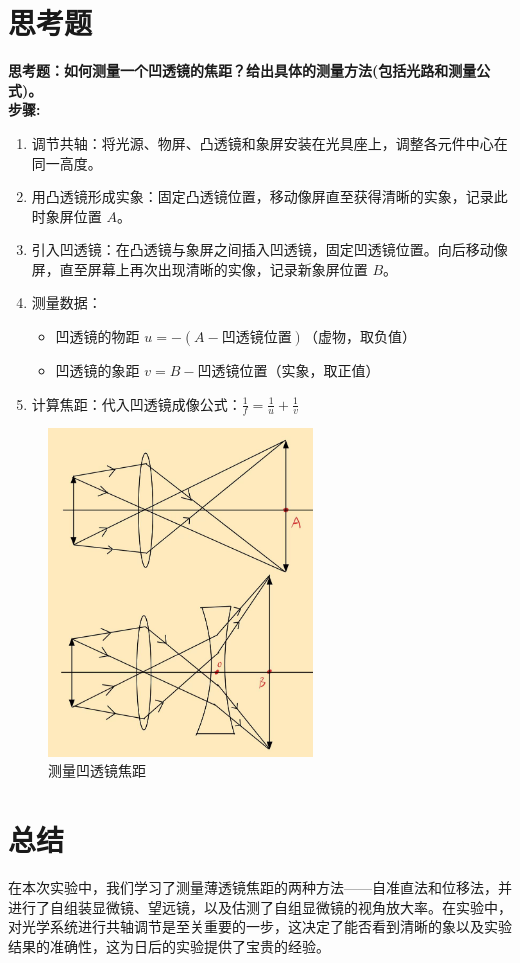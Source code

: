 \documentclass{article}
\begin{document}
\section{思考题}
\textbf{思考题：如何测量一个凹透镜的焦距？给出具体的测量方法(包括光路和测量公式)。}\\
\textbf{步骤:}\\
\begin{enumerate}
    \item 调节共轴：将光源、物屏、凸透镜和象屏安装在光具座上，调整各元件中心在同一高度。
    \item 用凸透镜形成实象：固定凸透镜位置，移动像屏直至获得清晰的实象，记录此时象屏位置 \(A\)。
    \item 引入凹透镜：在凸透镜与象屏之间插入凹透镜，固定凹透镜位置。向后移动像屏，直至屏幕上再次出现清晰的实像，记录新象屏位置 \(B\)。
    \item 测量数据：
        \begin{itemize}
            \item 凹透镜的物距 \(u = -(A - \text{凹透镜位置})\)（虚物，取负值）
            \item 凹透镜的象距 \(v = B - \text{凹透镜位置}\)（实象，取正值）
        \end{itemize}
    \item 计算焦距：代入凹透镜成像公式：$\frac{1}{f}=\frac{1}{u}+\frac{1}{v}$
    \end{enumerate}
    \begin{figure}[h]
        \centering
        \includegraphics[width=7cm]{6.1.jpg} %
        \caption{测量凹透镜焦距}
    \end{figure}
\section{总结}
\hspace*{2em}在本次实验中，我们学习了测量薄透镜焦距的两种方法——自准直法和位移法，并进行了自组装显微镜、望远镜，以及估测了自组显微镜的视角放大率。在实验中，对光学系统进行共轴调节是至关重要的一步，这决定了能否看到清晰的象以及实验结果的准确性，这为日后的实验提供了宝贵的经验。
\end{document}
